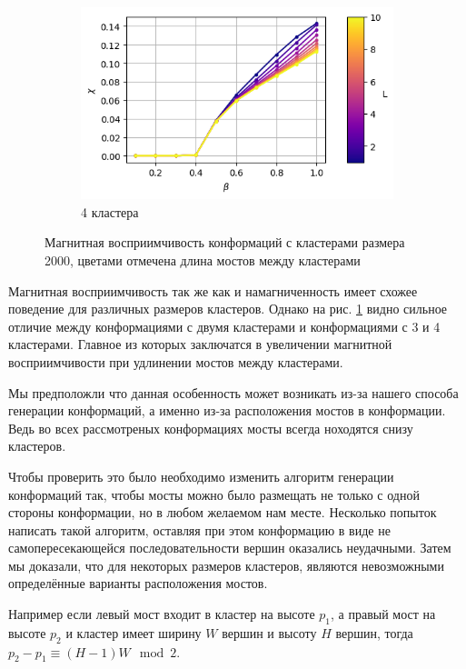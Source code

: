 \documentclass[14pt]{extarticle}
\begin{document}
\begin{figure}[ht]
\begin{subfigure}[t]{0.3\textwidth}
    \end{subfigure}
    \begin{subfigure}[t]{0.3\textwidth}
        \includegraphics*[width=\textwidth]{../images/magnetic_susceptibility/clusterized_W20_H50_N4.png}
        \caption*{4 кластера}
    \end{subfigure}
	\caption{Магнитная восприимчивость конформаций с кластерами размера 2000, цветами отмечена длина мостов между кластерами}
	\label{fig:cluster_magnetc_sus}
\end{figure}

Магнитная восприимчивость так же как и намагниченность имеет схожее поведение для различных размеров кластеров. Однако на рис. \ref*{fig:cluster_magnetc_sus} видно сильное отличие между конформациями с двумя кластерами и конформациями с 3 и 4 кластерами. Главное из которых заключатся в увеличении магнитной восприимчивости при удлинении мостов между кластерами.

Мы предположли что данная особенность может возникать из-за нашего способа генерации конформаций, а именно из-за расположения мостов в конформации. Ведь во всех рассмотреных конформациях мосты всегда ноходятся снизу кластеров.

Чтобы проверить это было необходимо изменить алгоритм генерации конформаций так, чтобы мосты можно было размещать не только с одной стороны конформации, но в любом желаемом нам месте.
Несколько попыток написать такой алгоритм, оставляя при этом конформацию в виде не самопересекающейся последовательности вершин оказались неудачными. Затем мы доказали, что для некоторых размеров кластеров, являются невозможными определённые варианты расположения мостов.

Например если левый мост входит в кластер на высоте $p_1$, а правый мост на высоте $p_2$ 
и кластер имеет ширину $W$ вершин и высоту $H$ вершин, тогда $p_2 - p_1 \equiv (H-1)W \mod 2$.
\end{document}

